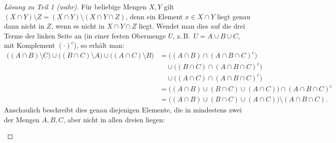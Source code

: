 \begin{proof}[Lösung zu Teil 1 (wahr)]
Für beliebige Mengen $X,Y$ gilt $(X\cap Y)\setminus Z = (X\cap Y)\setminus(X\cap Y\cap Z)$, denn ein Element $x\in X\cap Y$ liegt genau dann nicht in $Z$, wenn es nicht in $X\cap Y\cap Z$ liegt. Wendet man dies auf die drei Terme der linken Seite an (in einer festen Obermenge $U$, z.\,B.\ $U=A\cup B\cup C$, mit Komplement $(\cdot)^c$), so erhält man:
\begin{align*}
    \bigl((A\cap B)\setminus C\bigr)\cup\bigl((B\cap C)\setminus A\bigr)\cup\bigl((A\cap C)\setminus B\bigr)
    &= \bigl((A\cap B)\cap (A\cap B\cap C)^c\bigr) \\
    &\quad \cup \bigl((B\cap C)\cap (A\cap B\cap C)^c\bigr) \\
    &\quad \cup \bigl((A\cap C)\cap (A\cap B\cap C)^c\bigr) \\
    &= \bigl((A\cap B)\cup(B\cap C)\cup(A\cap C)\bigr)\cap (A\cap B\cap C)^c \\
    &= \bigl((A\cap B)\cup(B\cap C)\cup(A\cap C)\bigr)\setminus(A\cap B\cap C).
\end{align*}
Anschaulich beschreibt dies genau diejenigen Elemente, die in mindestens zwei der Mengen $A,B,C$, aber nicht in allen dreien liegen:

\begin{center}
\end{center}
\end{proof}

